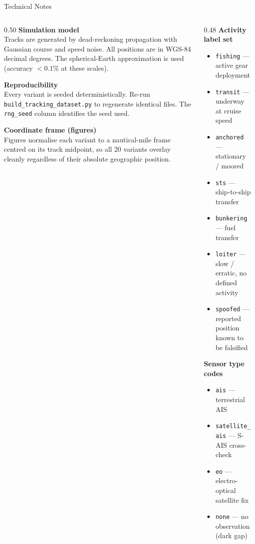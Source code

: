 \documentclass[aspectratio=169,11pt]{beamer}
\begin{document}
\begin{frame}{Technical Notes}

  \begin{columns}[T]
    \begin{column}{0.50\textwidth}
      \textbf{Simulation model} \\
      Tracks are generated by dead-reckoning propagation with Gaussian
      course and speed noise. All positions are in WGS-84 decimal degrees.
      The spherical-Earth approximation is used (accuracy $<$0.1\% at these
      scales).

      \bigskip
      \textbf{Reproducibility} \\
      Every variant is seeded deterministically. Re-run
      \texttt{build\_tracking\_dataset.py} to regenerate identical files.
      The \texttt{rng\_seed} column identifies the seed used.

      \bigskip
      \textbf{Coordinate frame (figures)} \\
      Figures normalise each variant to a nautical-mile frame centred on
      its track midpoint, so all 20 variants overlay cleanly regardless
      of their absolute geographic position.
    \end{column}
    \begin{column}{0.48\textwidth}
      \textbf{Activity label set}
      \begin{itemize}
        \item \texttt{fishing} — active gear deployment
        \item \texttt{transit} — underway at cruise speed
        \item \texttt{anchored} — stationary / moored
        \item \texttt{sts} — ship-to-ship transfer
        \item \texttt{bunkering} — fuel transfer
        \item \texttt{loiter} — slow / erratic, no defined activity
        \item \texttt{spoofed} — reported position known to be falsified
      \end{itemize}

      \bigskip
      \textbf{Sensor type codes}
      \begin{itemize}
        \item \texttt{ais} — terrestrial AIS
        \item \texttt{satellite\_ais} — S-AIS cross-check
        \item \texttt{eo} — electro-optical satellite fix
        \item \texttt{none} — no observation (dark gap)
      \end{itemize}
    \end{column}
  \end{columns}
\end{frame}
\end{document}

